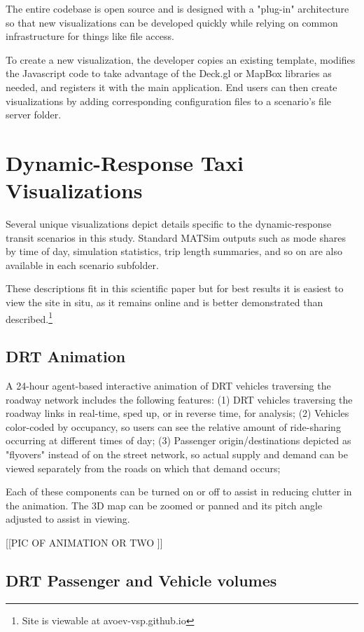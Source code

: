 \documentclass[3p,times,procedia]{elsarticle}
\begin{document}
The entire codebase is open source and is designed with a "plug-in" architecture so that new visualizations can be developed quickly while relying on common infrastructure for things like file access.

To create a new visualization, the developer copies an existing template, modifies the Javascript code to take advantage of the Deck.gl or MapBox libraries as needed, and registers it with the main application. End users can then create visualizations by adding corresponding configuration files to a scenario's file server folder.

\section{Dynamic-Response Taxi Visualizations}
\label{drtviz}

Several unique visualizations depict details specific to the dynamic-response transit scenarios in this study. Standard MATSim outputs such as mode shares by time of day, simulation statistics, trip length summaries, and so on are also available in each scenario subfolder.

These descriptions fit in this scientific paper but for best results it is easiest to view the site in situ, as it remains online and is better demonstrated than described.\footnote{Site is viewable at avoev-vsp.github.io}

\subsection{DRT Animation}

A 24-hour agent-based interactive animation of DRT vehicles traversing the roadway network includes the following features: (1) DRT vehicles traversing the roadway links in real-time, sped up, or in reverse time, for analysis; (2) Vehicles color-coded by occupancy, so users can see the relative amount of ride-sharing occurring at different times of day; (3) Passenger origin/destinations depicted as "flyovers" instead of on the street network, so actual supply and demand can be viewed separately from the roads on which that demand occurs;

Each of these components can be turned on or off to assist in reducing clutter in the animation. The 3D map can be zoomed or panned and its pitch angle adjusted to assist in viewing.

[[PIC OF ANIMATION OR TWO ]]

\subsection{DRT Passenger and Vehicle volumes}
\end{document}
